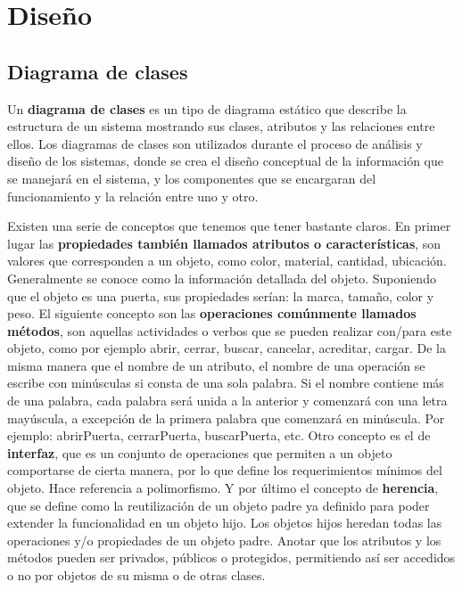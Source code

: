 \documentclass[a4paper,oneside,11pt]{book}
\begin{document}
	
\chapter{Diseño} %
\label{cha:diseno}

	
	\section{Diagrama de clases} %
	\label{sec:diagrama_de_clases}
	
		Un \textbf{diagrama de clases} es un tipo de diagrama estático que describe la estructura de un sistema mostrando sus clases, atributos y las relaciones entre ellos. Los diagramas de clases son utilizados durante el proceso de análisis y diseño de los sistemas, donde se crea el diseño conceptual de la información que se manejará en el sistema, y los componentes que se encargaran del funcionamiento y la relación entre uno y otro.
		
		Existen una serie de conceptos que tenemos que tener bastante claros. En primer lugar las \textbf{propiedades también llamados atributos o características}, son valores que corresponden a un objeto, como color, material, cantidad, ubicación. Generalmente se conoce como la información detallada del objeto. Suponiendo que el objeto es una puerta, sus propiedades serían: la marca, tamaño, color y peso.	El siguiente concepto son las \textbf{operaciones comúnmente llamados métodos}, son aquellas actividades o verbos que se pueden realizar con/para este objeto, como por ejemplo abrir, cerrar, buscar, cancelar, acreditar, cargar. De la misma manera que el nombre de un atributo, el nombre de una operación se escribe con minúsculas si consta de una sola palabra. Si el nombre contiene más de una palabra, cada palabra será unida a la anterior y comenzará con una letra mayúscula, a excepción de la primera palabra que comenzará en minúscula. Por ejemplo: abrirPuerta, cerrarPuerta, buscarPuerta, etc. Otro concepto es el de \textbf{interfaz}, que es un conjunto de operaciones que permiten a un objeto comportarse de cierta manera, por lo que define los requerimientos mínimos del objeto. Hace referencia a polimorfismo. Y por último el concepto de \textbf{herencia}, que se define como la reutilización de un objeto padre ya definido para poder extender la funcionalidad en un objeto hijo. Los objetos hijos heredan todas las operaciones y/o propiedades de un objeto padre. Anotar que los atributos y los métodos pueden ser privados, públicos o protegidos, permitiendo así ser accedidos o no por objetos de su misma o de otras clases. 
		
\end{document}
